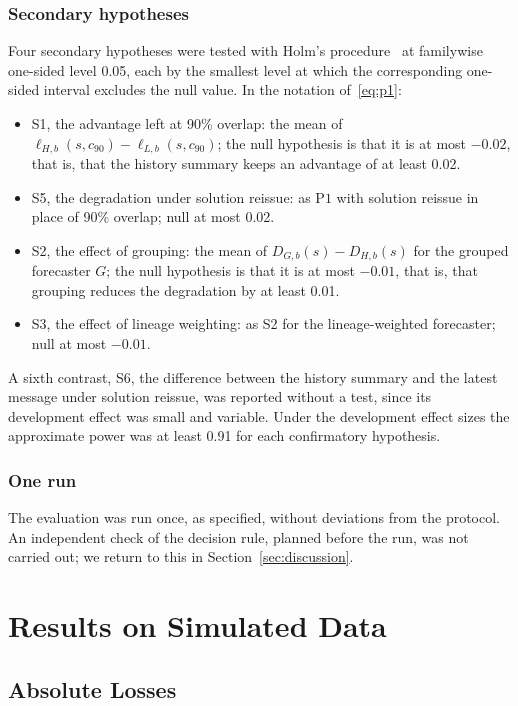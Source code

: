 \documentclass[conference]{IEEEtran}
\newcommand{\Pone}{\mathrm{P1}}
\begin{document}
\subsubsection*{Secondary hypotheses}
Four secondary hypotheses were tested with Holm's procedure~\cite{holm1979} at familywise one-sided level 0.05, each by the smallest level at which the corresponding one-sided interval excludes the null value. In the notation of~\eqref{eq:p1}:
\begin{itemize}
\item S1, the advantage left at 90\% overlap: the mean of $\ell_{H,b}(s,c_{90})-\ell_{L,b}(s,c_{90})$; the null hypothesis is that it is at most $-0.02$, that is, that the history summary keeps an advantage of at least 0.02.
\item S5, the degradation under solution reissue: as $\Pone$ with solution reissue in place of 90\% overlap; null at most 0.02.
\item S2, the effect of grouping: the mean of $D_{G,b}(s)-D_{H,b}(s)$ for the grouped forecaster $G$; the null hypothesis is that it is at most $-0.01$, that is, that grouping reduces the degradation by at least 0.01.
\item S3, the effect of lineage weighting: as S2 for the lineage-weighted forecaster; null at most $-0.01$.
\end{itemize}
A sixth contrast, S6, the difference between the history summary and the latest message under solution reissue, was reported without a test, since its development effect was small and variable. Under the development effect sizes the approximate power was at least 0.91 for each confirmatory hypothesis.

\subsubsection*{One run}
The evaluation was run once, as specified, without deviations from the protocol. An independent check of the decision rule, planned before the run, was not carried out; we return to this in Section~\ref{sec:discussion}.

\section{Results on Simulated Data}\label{sec:results}

\subsection{Absolute Losses}
\end{document}
